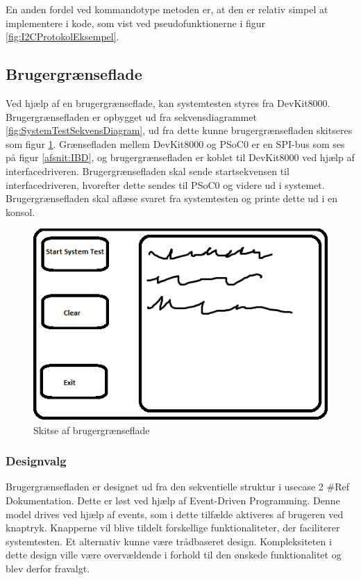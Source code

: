 En anden fordel ved kommandotype metoden er, at den er relativ simpel at implementere i kode, som vist ved pseudofunktionerne i figur \ref{fig:I2CProtokolEksempel}.


\subsection{Brugergrænseflade}
Ved hjælp af en brugergrænseflade, kan systemtesten styres fra DevKit8000.
Brugergrænsefladen er opbygget ud fra sekvensdiagrammet \ref{fig:SystemTestSekvensDiagram},
ud fra dette kunne brugergrænsefladen skitseres som figur \ref{fig:GUISkitse}.
Grænsefladen mellem DevKit8000 og PSoC0 er en SPI-bus som ses på figur \ref{afsnit:IBD}, og brugergrænsefladen er koblet til DevKit8000 ved hjælp af interfacedriveren.
Brugergrænsefladen skal sende startsekvensen til interfacedriveren, hvorefter dette sendes til PSoC0 og videre ud i systemet.
Brugergrænsefladen skal aflæse svaret fra systemtesten og printe dette ud i en konsol.

\begin{figure}[H]
	\centering
	\includegraphics[width=\textwidth] {Systemarkitektur/images/GUISkitse}
	\caption{Skitse af brugergrænseflade}
	\label{fig:GUISkitse}
\end{figure}

\subsubsection{Designvalg}
Brugergrænsefladen er designet ud fra den sekventielle struktur i usecase 2 \#Ref Dokumentation. Dette er løst ved hjælp af Event-Driven Programming.
Denne model drives ved hjælp af events, som i dette tilfælde aktiveres af brugeren ved knaptryk. Knapperne vil blive tildelt forskellige funktionaliteter, der faciliterer systemtesten.
Et alternativ kunne være trådbaseret design. Kompleksiteten i dette design ville være overvældende i forhold til den ønskede funktionalitet og blev derfor fravalgt.